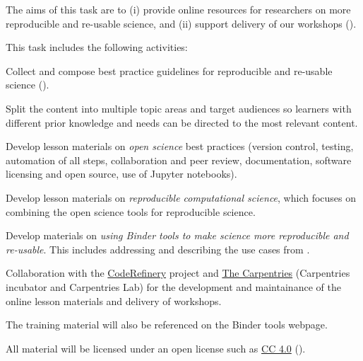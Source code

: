 \begin{task}[
  title=Best practice guidelines for reproducible science,
  id=online-resources,
  lead=UIO,
  PM=13,
  wphases={0-36!0.36},
  partners={SRL,MP,IFR}
]
The aims of this task are to (i) provide online resources for researchers on more reproducible
and re-usable science, and (ii) support delivery of our workshops
().

This task includes the following activities:
  \begin{compactitem}
  \item Collect and compose best practice guidelines for reproducible and
    re-usable science ().
  \item Split the content into multiple topic areas and target audiences so learners
    with different prior knowledge and needs can be directed to the most relevant content.
  \item Develop lesson materials on \emph{open science} best practices (version
    control, testing, automation of all steps, collaboration and peer review,
    documentation, software licensing and open source, use of Jupyter
    notebooks).
  \item Develop lesson materials on \emph{reproducible computational science},
    which focuses on combining the open science tools for reproducible science.
  \item Develop materials on \emph{using Binder tools to make science more
      reproducible and re-usable}. This includes addressing and describing the
    use cases from .
  \item Collaboration with the \href{https://coderefinery.org}{CodeRefinery}
    project and \href{https://carpentries.org/}{The Carpentries} (Carpentries incubator and Carpentries Lab)
    for the development and maintainance of the online lesson materials and delivery of workshops.
  \item The training material will also be referenced on the Binder tools webpage.
  \end{compactitem}
  All material will be licensed under an open license such as
  \href{https://creativecommons.org/licenses/by/4.0/}{CC 4.0}
  ().
\end{task}
